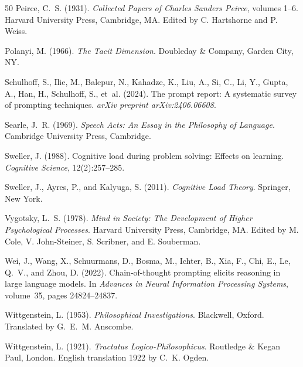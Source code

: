\documentclass[12pt,a4paper]{article}
\begin{document}
\begin{thebibliography}{50}
Peirce, C.~S. (1931).
\newblock \emph{Collected Papers of Charles Sanders Peirce}, volumes 1--6.
\newblock Harvard University Press, Cambridge, MA.
\newblock Edited by C. Hartshorne and P. Weiss.

Polanyi, M. (1966).
\newblock \emph{The Tacit Dimension}.
\newblock Doubleday \& Company, Garden City, NY.

Schulhoff, S., Ilie, M., Balepur, N., Kahadze, K., Liu, A., Si, C., Li, Y., Gupta, A., Han, H., Schulhoff, S., et~al. (2024).
\newblock The prompt report: A systematic survey of prompting techniques.
\newblock \emph{arXiv preprint arXiv:2406.06608}.

Searle, J.~R. (1969).
\newblock \emph{Speech Acts: An Essay in the Philosophy of Language}.
\newblock Cambridge University Press, Cambridge.

Sweller, J. (1988).
\newblock Cognitive load during problem solving: Effects on learning.
\newblock \emph{Cognitive Science}, 12(2):257--285.

Sweller, J., Ayres, P., and Kalyuga, S. (2011).
\newblock \emph{Cognitive Load Theory}.
\newblock Springer, New York.

Vygotsky, L.~S. (1978).
\newblock \emph{Mind in Society: The Development of Higher Psychological Processes}.
\newblock Harvard University Press, Cambridge, MA.
\newblock Edited by M. Cole, V. John-Steiner, S. Scribner, and E. Souberman.

Wei, J., Wang, X., Schuurmans, D., Bosma, M., Ichter, B., Xia, F., Chi, E., Le, Q.~V., and Zhou, D. (2022).
\newblock Chain-of-thought prompting elicits reasoning in large language models.
\newblock In \emph{Advances in Neural Information Processing Systems}, volume~35, pages 24824--24837.

Wittgenstein, L. (1953).
\newblock \emph{Philosophical Investigations}.
\newblock Blackwell, Oxford.
\newblock Translated by G.~E.~M. Anscombe.

Wittgenstein, L. (1921).
\newblock \emph{Tractatus Logico-Philosophicus}.
\newblock Routledge \& Kegan Paul, London.
\newblock English translation 1922 by C.~K. Ogden.


\end{thebibliography}
\end{document}
